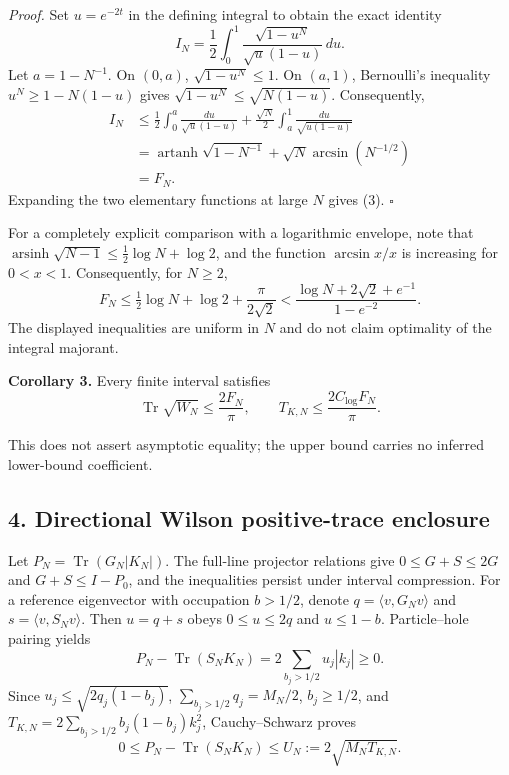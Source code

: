 \documentclass[
  10pt,
  a4paper,
]{article}
\begin{document}
\emph{Proof.} Set \(u=e^{-2t}\) in the defining integral to obtain the exact identity \[
I_N=\frac12\int_0^1\frac{\sqrt{1-u^N}}{\sqrt u(1-u)}\,du.
\] Let \(a=1-N^{-1}\). On \((0,a)\), \(\sqrt{1-u^N}\le1\). On \((a,1)\), Bernoulli's inequality \(u^N\ge1-N(1-u)\) gives \(\sqrt{1-u^N}\le\sqrt{N(1-u)}\). Consequently, \[
\begin{split}
I_N&\le\frac12\int_0^a\frac{du}{\sqrt u(1-u)}
+\frac{\sqrt N}2\int_a^1\frac{du}{\sqrt{u(1-u)}}\\
&=\operatorname{artanh}\sqrt{1-N^{-1}}
+\sqrt N\arcsin(N^{-1/2})\\
&=F_N.
\end{split}
\] Expanding the two elementary functions at large \(N\) gives (3). \(\square\)

For a completely explicit comparison with a logarithmic envelope, note that \(\operatorname{arsinh}\sqrt{N-1}\le\tfrac12\log N+\log2\), and the function \(\arcsin x/x\) is increasing for \(0<x<1\). Consequently, for \(N\ge2\), \[
F_N\le\tfrac12\log N+\log2+\frac{\pi}{2\sqrt2}
<\frac{\log N+2\sqrt2+e^{-1}}{1-e^{-2}}.
\] The displayed inequalities are uniform in \(N\) and do not claim optimality of the integral majorant.

\textbf{Corollary 3.} Every finite interval satisfies \[
\operatorname{Tr}\sqrt{W_N}\le \frac{2F_N}{\pi},\qquad
T_{K,N}\le\frac{2C_{\log}F_N}{\pi}.\tag{4}
\]

This does not assert asymptotic equality; the upper bound carries no inferred lower-bound coefficient.

\subsection{4. Directional Wilson positive-trace enclosure}\label{directional-wilson-positive-trace-enclosure}

Let \(P_N=\operatorname{Tr}(G_N|K_N|)\). The full-line projector relations give \(0\le G+S\le2G\) and \(G+S\le I-P_0\), and the inequalities persist under interval compression. For a reference eigenvector with occupation \(b>1/2\), denote \(q=\langle v,G_Nv\rangle\) and \(s=\langle v,S_Nv\rangle\). Then \(u=q+s\) obeys \(0\le u\le2q\) and \(u\le1-b\). Particle--hole pairing yields \[
P_N-\operatorname{Tr}(S_NK_N)
=2\sum_{b_j>1/2}u_j|k_j|\ge0.
\] Since \(u_j\le\sqrt{2q_j(1-b_j)}\), \(\sum_{b_j>1/2}q_j=M_N/2\), \(b_j\ge1/2\), and \(T_{K,N}=2\sum_{b_j>1/2}b_j(1-b_j)k_j^2\), Cauchy--Schwarz proves \[
\boxed{0\le P_N-\operatorname{Tr}(S_NK_N)
\le U_N:=2\sqrt{M_NT_{K,N}}.}\tag{5}
\]
\end{document}
